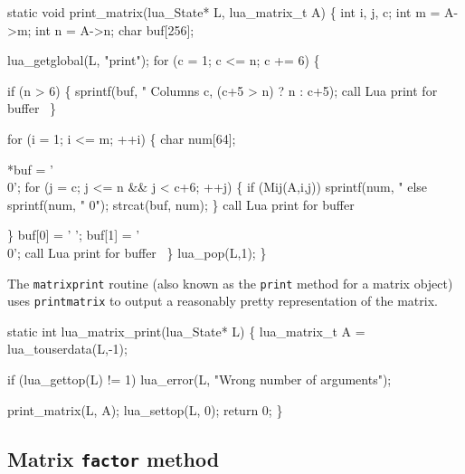 \nwenddocs{}\plusendmoddef
static void print_matrix(lua_State* L, lua_matrix_t A)
\{
    int i, j, c;
    int m = A->m;
    int n = A->n;
    char buf[256];

    lua_getglobal(L, "print");
    for (c = 1; c <= n; c += 6) \{

        if (n > 6) \{
            sprintf(buf, "  Columns %
                    c, (c+5 > n) ? n : c+5);
            \LA{}call Lua print for buffer~{\nwtagstyle{}}\RA{}
        \}

        for (i = 1; i <= m; ++i) \{
            char num[64];

            *buf = '\\0';
            for (j = c; j <= n && j < c+6; ++j) \{
                if (Mij(A,i,j))
                    sprintf(num, "  %
                else
                    sprintf(num, "            0");
                strcat(buf, num);
            \}
            \LA{}call Lua print for buffer~{\nwtagstyle{}}\RA{}

        \}
        buf[0] = ' ';
        buf[1] = '\\0';
        \LA{}call Lua print for buffer~{\nwtagstyle{}}\RA{}
    \}
    lua_pop(L,1);
\}

\nwendcode{}\nwdocspar

The {\tt{}matrix{}print} routine (also known as the {\tt{}print} method
for a matrix object) uses {\tt{}print{}matrix} to output a reasonably
pretty representation of the matrix.

\nwenddocs{}\plusendmoddef
static int lua_matrix_print(lua_State* L)
\{
    lua_matrix_t A = lua_touserdata(L,-1);

    if (lua_gettop(L) != 1)
        lua_error(L, "Wrong number of arguments");

    print_matrix(L, A);
    lua_settop(L, 0);
    return 0;
\}

\nwendcode{}\nwdocspar


\subsection{Matrix {\tt{}factor} method}

